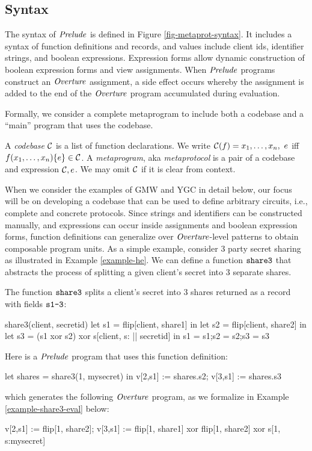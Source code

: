 \subsection{Syntax}

The syntax of $\mathit{Prelude}$ is defined in Figure
\ref{fig-metaprot-syntax}.  It includes a syntax of function
definitions and records, and values include client ids, identifier
strings, and boolean expressions. Expression forms allow dynamic
construction of boolean expression forms and view assignments. When
$\mathit{Prelude}$ programs construct an $\mathit{Overture}$ assignment, a side effect
occurs whereby the assignment is added to the end of the $\mathit{Overture}$
program accumulated during evaluation.

Formally, we consider a complete metaprogram to include both a
codebase and a ``main'' program that uses the codebase. 
\begin{definition}
A \emph{codebase} $\mathcal{C}$ is a list of function 
declarations. We write $ \mathcal{C}(f) = x_1,\ldots,x_n,\ e$
iff $f(x_1,\ldots,x_n) \{ e \} \in \mathcal{C}$.
A \emph{metaprogram}, aka \emph{metaprotocol}  is a pair of a 
codebase and expression $\mathcal{C}, e$. We may omit
$\mathcal{C}$ if it is clear from context.  
\end{definition}

When we consider the examples of GMW and YGC in detail below, our
focus will be on developing a codebase that can be used to define
arbitrary circuits, i.e., complete and concrete protocols. Since
strings and identifiers can be constructed manually, and expressions
can occur inside assignments and boolean expression forms, function
definitions can generalize over $\mathit{Overture}$-level patterns to obtain
composable program units.   As a simple example, consider 3 party secret sharing as
illustrated in Example \ref{example-he}. We can define a function
$\texttt{share3}$ that abstracts the process of splitting a given
client's secret into 3 separate shares.
\begin{example} \label{example-share3} The function $\texttt{share3}$ 
  splits a client's secret into 3 shares returned as a record
  with fields $\texttt{s1-3}$:
  {\small
  \begin{verbatimtab}
      share3(client, secretid) {
        let s1 = flip[client, share1] in
        let s2 = flip[client, share2] in
        let s3 = (s1 xor s2) xor s[client, s: || secretid] in
        {s1 = s1;s2 = s2;s3 = s3}
      } \end{verbatimtab}
  }
  Here is a $\mathit{Prelude}$ program that uses this function definition:
  {\small
    \begin{verbatimtab}
      let shares = share3(1, mysecret) in
      v[2,s1] := shares.s2;
      v[3,s1] := shares.s3 \end{verbatimtab}
  }
  which generates the following $\mathit{Overture}$ program, as we formalize in Example \ref{example-share3-eval}
  below:
  {\small
  \begin{verbatimtab}
      v[2,s1] := flip[1, share2];
      v[3,s1] := flip[1, share1] xor flip[1, share2] xor s[1, s:mysecret] \end{verbatimtab}
  }
\end{example}

